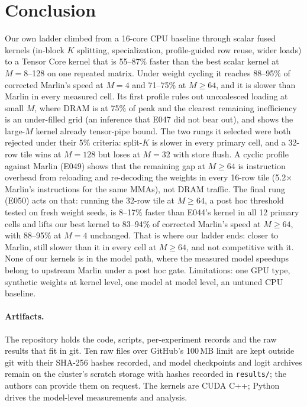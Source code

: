 \documentclass[sigconf,nonacm]{acmart}
\begin{document}
\section{Conclusion}
Our own ladder climbed from a 16-core CPU baseline through scalar fused kernels (in-block $K$ splitting, specialization, profile-guided row reuse, wider loads) to a Tensor Core kernel that is 55--87\% faster than the best scalar kernel at $M=8$--128 on one repeated matrix. Under weight cycling it reaches 88--95\% of corrected Marlin's speed at $M=4$ and 71--75\% at $M \ge 64$, and it is slower than Marlin in every measured cell. Its first profile rules out uncoalesced loading at small $M$, where DRAM is at 75\% of peak and the clearest remaining inefficiency is an under-filled grid (an inference that E047 did not bear out), and shows the large-$M$ kernel already tensor-pipe bound. The two rungs it selected were both rejected under their 5\% criteria: split-$K$ is slower in every primary cell, and a 32-row tile wins at $M=128$ but loses at $M=32$ with store flush. A cyclic profile against Marlin (E049) shows that the remaining gap at $M \ge 64$ is instruction overhead from reloading and re-decoding the weights in every 16-row tile (5.2$\times$ Marlin's instructions for the same MMAs), not DRAM traffic. The final rung (E050) acts on that: running the 32-row tile at $M \ge 64$, a post hoc threshold tested on fresh weight seeds, is 8--17\% faster than E044's kernel in all 12 primary cells and lifts our best kernel to 83--94\% of corrected Marlin's speed at $M \ge 64$, with 88--95\% at $M=4$ unchanged. That is where our ladder ends: closer to Marlin, still slower than it in every cell at $M \ge 64$, and not competitive with it. None of our kernels is in the model path, where the measured model speedups belong to upstream Marlin under a post hoc gate. Limitations: one GPU type, synthetic weights at kernel level, one model at model level, an untuned CPU baseline.

\paragraph{Artifacts.} The repository holds the code, scripts, per-experiment records and the raw results that fit in git. Ten raw files over GitHub's 100\,MB limit are kept outside git with their SHA-256 hashes recorded, and model checkpoints and logit archives remain on the cluster's scratch storage with hashes recorded in \texttt{results/}; the authors can provide them on request. The kernels are CUDA C++; Python drives the model-level measurements and analysis.
\end{document}
